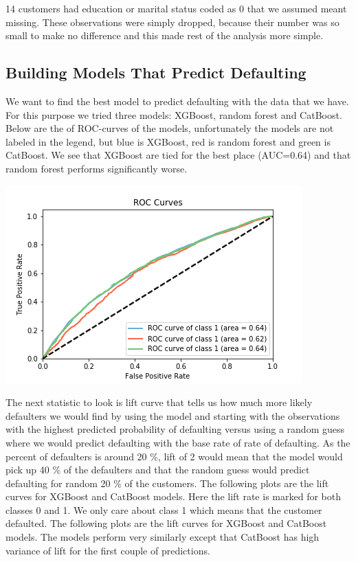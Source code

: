 \documentclass[12pt,a4paper,leqno]{report}
\theoremstyle{plain}
\theoremstyle{definition}
\theoremstyle{remark}
\begin{document}
14 customers had education or marital status coded as 0 that we assumed
meant missing. These observations were simply dropped, because their number was so
small to make no difference and this made rest of the analysis more simple.

\subsection{Building Models That Predict Defaulting}

We want to find the best model to predict defaulting with the data that we have.
For this purpose we tried three models: XGBoost, random forest and CatBoost.
Below are the of ROC-curves of the models, unfortunately the models are not
labeled in the legend, but blue is XGBoost, red is random forest and green
is CatBoost. We see that XGBoost are tied for the best place (AUC=0.64) and
that random forest performs significantly worse.

\bigskip
{
    \centering
    \includegraphics[width=\textwidth,height=\textheight,keepaspectratio]{roc_curves.png}
    \par
}
\bigskip

The next statistic to look is lift curve that tells us how much more likely defaulters
we would find by using the model and starting with the observations with the
highest predicted probability of defaulting versus using a random guess where we would
predict defaulting with the base rate of rate of defaulting.
As the percent of defaulters is around 20 \%, lift of 2 would mean that
the model would pick up 40 \% of the defaulters and that the random guess would
predict defaulting for random 20 \% of the customers.
The following plots are the lift curves for XGBoost and CatBoost models.
Here the lift rate is marked for both classes 0 and 1. We only care about
class 1 which means that the customer defaulted.
The following plots are the lift curves for XGBoost and CatBoost models. The
models perform very similarly except that CatBoost has high variance of
lift for the first couple of predictions.
\end{document}
